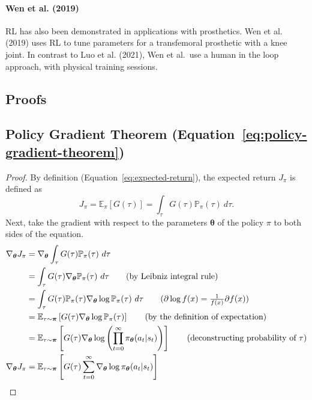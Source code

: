 \documentclass[12pt]{report}
\theoremstyle{definition}
\theoremstyle{remark}
\begin{document}
\subsubsection{Wen et  al. (2019)}

RL has also been demonstrated in applications with prosthetics. Wen et al. (2019) uses RL to tune parameters for a transfemoral prosthetic with a knee joint. In contrast to Luo et al. (2021), Wen et al.\ use a human in the loop approach, with physical training sessions.

\begin{appendices}
\chapter{Proofs}
\section{Policy Gradient Theorem (Equation~\ref{eq:policy-gradient-theorem})}\label{sec:policy-gradient-theorem-proof}
\begin{proof}
    By definition (Equation~\ref{eq:expected-return}), the expected return $J_\pi$ is defined as
    \begin{equation*}
        J_\pi = \mathbb{E}_\pi[G(\tau)] = \int_{\tau} G(\tau)\mathbb{P}_{\pi}(\tau)\ d\tau.
    \end{equation*}
    Next, take the gradient with respect to the parameters $\boldsymbol{\theta}$ of the policy $\pi$ to both sides of the equation.
    \begin{align*}
        \nabla_{\boldsymbol{\theta}} J_\pi &= \nabla_{\boldsymbol{\theta}} \int_{\tau} G(\tau)\mathbb{P}_{\pi}(\tau)\ d\tau \\
        &= \int_{\tau} G(\tau) \nabla_{\boldsymbol{\theta}} \mathbb{P}_{\pi}(\tau)\ d\tau \tag{by Leibniz integral rule} \\
        &= \int_{\tau} G(\tau) \mathbb{P}_{\pi}(\tau) \nabla_{\boldsymbol{\theta}} \log \mathbb{P}_{\pi}(\tau)\ d\tau \tag{$\partial \log f(x) = \frac{1}{f(x)}\partial f(x)$} \\
        &= \mathbb{E}_{\tau\sim\boldsymbol{\pi}}\left[G(\tau) \nabla_{\boldsymbol{\theta}} \log \mathbb{P}_{\pi}(\tau)\right] \tag{by the definition of expectation} \\
        &= \mathbb{E}_{\tau\sim\boldsymbol{\pi}}\left[G(\tau) \nabla_{\boldsymbol{\theta}} \log \left(\prod_{t=0}^{\infty} \pi_{\boldsymbol{\theta}}(a_t | s_t)\right)\right] \tag{deconstructing probability of $\tau$} \\
        \nabla_{\boldsymbol{\theta}} J_\pi &= \mathbb{E}_{\tau\sim\boldsymbol{\pi}}\left[G(\tau) \sum_{t=0}^{\infty} \nabla_{\boldsymbol{\theta}} \log \pi_{\boldsymbol{\theta}}(a_t | s_t)\right]
    \end{align*}
\end{proof}


\end{appendices}
\end{document}
